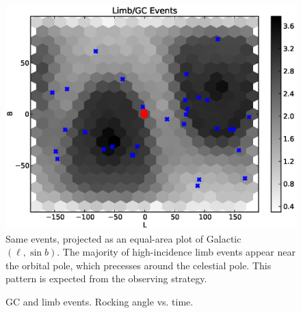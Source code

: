 \documentclass[aps,twocolumn,prd,superscriptaddress,showpacs,nofootinbib,fixfloat]{revtex4}
\begin{document}
% 
\begin{figure}
  \centering
  \includegraphics[width=1.0\linewidth]{plots/limb_l_b.eps}
  \caption{Same events, projected as an equal-area plot of Galactic $(\ell,
  \sin b)$.  The majority of high-incidence limb events appear near the
  orbital pole, which precesses around the celestial pole.  This pattern is
  expected from the observing strategy.}
  \label{fig:l-b}
\end{figure}

\begin{figure}
  \begin{center}
  \end{center}
  \caption{GC and limb events. Rocking angle vs. time.}
  \label{fig:rockTime}
\end{figure}
\end{document}
